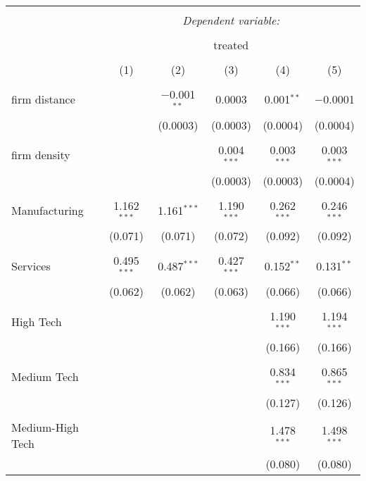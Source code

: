 
\begin{table}[!htbp] \centering 
  \caption{} 
  \label{} 
\begin{tabular}{@{\extracolsep{5pt}}lccccc} 
\\[-1.8ex]\hline 
\hline \\[-1.8ex] 
 & \multicolumn{5}{c}{\textit{Dependent variable:}} \\ 
\cline{2-6} 
\\[-1.8ex] & \multicolumn{5}{c}{treated} \\ 
\\[-1.8ex] & (1) & (2) & (3) & (4) & (5)\\ 
\hline \\[-1.8ex] 
 firm distance &  & $-$0.001$^{**}$ & 0.0003 & 0.001$^{**}$ & $-$0.0001 \\ 
  &  & (0.0003) & (0.0003) & (0.0004) & (0.0004) \\ 
  & & & & & \\ 
 firm density &  &  & 0.004$^{***}$ & 0.003$^{***}$ & 0.003$^{***}$ \\ 
  &  &  & (0.0003) & (0.0003) & (0.0004) \\ 
  & & & & & \\ 
 Manufacturing & 1.162$^{***}$ & 1.161$^{***}$ & 1.190$^{***}$ & 0.262$^{***}$ & 0.246$^{***}$ \\ 
  & (0.071) & (0.071) & (0.072) & (0.092) & (0.092) \\ 
  & & & & & \\ 
 Services & 0.495$^{***}$ & 0.487$^{***}$ & 0.427$^{***}$ & 0.152$^{**}$ & 0.131$^{**}$ \\ 
  & (0.062) & (0.062) & (0.063) & (0.066) & (0.066) \\ 
  & & & & & \\ 
 High Tech &  &  &  & 1.190$^{***}$ & 1.194$^{***}$ \\ 
  &  &  &  & (0.166) & (0.166) \\ 
  & & & & & \\ 
 Medium Tech &  &  &  & 0.834$^{***}$ & 0.865$^{***}$ \\ 
  &  &  &  & (0.127) & (0.126) \\ 
  & & & & & \\ 
 Medium-High Tech &  &  &  & 1.478$^{***}$ & 1.498$^{***}$ \\ 
  &  &  &  & (0.080) & (0.080) \\ 

\end{tabular}
\end{table}
